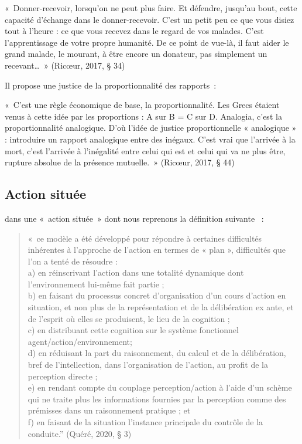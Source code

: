 \documentclass[
  a4paper,
  DIV=11,
  numbers=noendperiod]{scrreprt}
\begin{document}
«~Donner-recevoir, lorsqu'on ne peut plus faire. Et défendre, jusqu'au
bout, cette capacité d'échange dans le donner-recevoir. C'est un petit
peu ce que vous disiez tout à l'heure : ce que vous recevez dans le
regard de vos malades. C'est l'apprentissage de votre propre humanité.
De ce point de vue-là, il faut aider le grand malade, le mourant, à être
encore un donateur, pas simplement un recevant\ldots~» (Ricœur, 2017, §
34)

Il propose une justice de la proportionnalité des rapports~:

«~C'est une règle économique de base, la proportionnalité. Les Grecs
étaient venus à cette idée par les proportions : A sur B = C sur D.
Analogia, c'est la proportionnalité analogique. D'où l'idée de justice
proportionnelle « analogique » : introduire un rapport analogique entre
des inégaux. C'est vrai que l'arrivée à la mort, c'est l'arrivée à
l'inégalité entre celui qui est et celui qui va ne plus être, rupture
absolue de la présence mutuelle.~» (Ricœur, 2017, § 44)

\subsection{Action située}\label{actionSitue}

dans une «~action située~» dont nous reprenons la définition suivante ~:

\begin{quote}
«~ce modèle a été développé pour répondre à certaines difficultés
inhérentes à l'approche de l'action en termes de « plan », difficultés
que l'on a tenté de résoudre :\\
a) en réinscrivant l'action dans une totalité dynamique dont
l'environnement lui-même fait partie ;\\
b) en faisant du processus concret d'organisation d'un cours d'action en
situation, et non plus de la représentation et de la délibération ex
ante, et de l'esprit où elles se produisent, le lieu de la cognition ;\\
c) en distribuant cette cognition sur le système fonctionnel
agent/action/environnement;\\
d) en réduisant la part du raisonnement, du calcul et de la
délibération, bref de l'intellection, dans l'organisation de l'action,
au profit de la perception directe ;\\
e) en rendant compte du couplage perception/action à l'aide d'un schème
qui ne traite plus les informations fournies par la perception comme des
prémisses dans un raisonnement pratique ; et\\
f) en faisant de la situation l'instance principale du contrôle de la
conduite.'' (Quéré, 2020, § 3)
\end{quote}
\end{document}
